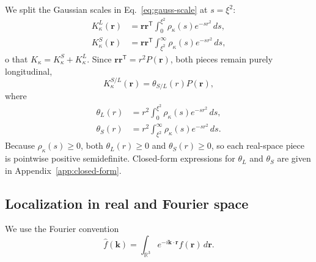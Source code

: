 \documentclass[11pt]{article}
\theoremstyle{plain}
\newcommand{\rr}{\bm r}
\newcommand{\kk}{\bm k}
\newcommand{\PP}{P}
\DeclareRobustCommand{\_}{\textunderscore\allowbreak}
\begin{document}
We split the Gaussian scales in Eq.~\eqref{eq:gauss-scale} at \(s=\xi^2\):
\begin{align}
K_\kappa^L(\rr)
&=
\rr\rr^{\mathsf T}
\int_0^{\xi^2}
\rho_\kappa(s)e^{-s r^2}\,ds,
\\
K_\kappa^S(\rr)
&=
\rr\rr^{\mathsf T}
\int_{\xi^2}^{\infty}
\rho_\kappa(s)e^{-s r^2}\,ds,
\end{align}
o that $K_\kappa=K_\kappa^S+K_\kappa^L$. Since
\(\rr\rr^{\mathsf T}=r^2\PP(\rr)\), both pieces remain purely longitudinal,
\begin{equation}
K_\kappa^{S/L}(\rr)
=
\theta_{S/L}(r)\PP(\rr),
\end{equation}
where
\begin{align}
\theta_L(r)
&=
r^2
\int_0^{\xi^2}
\rho_\kappa(s)e^{-s r^2}\,ds,
\\
\theta_S(r)
&=
r^2
\int_{\xi^2}^{\infty}
\rho_\kappa(s)e^{-s r^2}\,ds.
\end{align}
Because \(\rho_\kappa(s)\ge 0\), both $\theta_L(r)\ge0$ and
$\theta_S(r)\ge0$, so each real-space piece is pointwise positive
semidefinite. Closed-form expressions for $\theta_L$ and $\theta_S$ are
given in Appendix~\ref{app:closed-form}.

\subsection{Localization in real and Fourier space}

We use the Fourier convention
\begin{equation}
\widehat f(\kk)
=
\int_{\mathbb R^3}
e^{-i\kk\cdot\rr}f(\rr)\,d\rr.
\end{equation}
\end{document}
